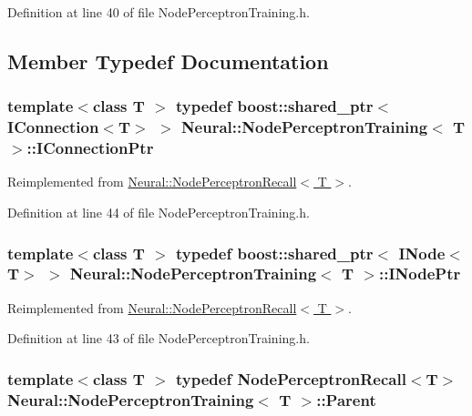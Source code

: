 Definition at line 40 of file NodePerceptronTraining.h.



\subsection{Member Typedef Documentation}
\hypertarget{class_neural_1_1_node_perceptron_training_acf502a8079c8e875773ac940986af738}{
\subsubsection[{IConnectionPtr}]{\setlength{\rightskip}{0pt plus 5cm}template$<$class T $>$ typedef boost::shared\_\-ptr$<$ {\bf IConnection}$<$T$>$ $>$ {\bf Neural::NodePerceptronTraining}$<$ T $>$::{\bf IConnectionPtr}}}
\label{class_neural_1_1_node_perceptron_training_acf502a8079c8e875773ac940986af738}


Reimplemented from \hyperlink{class_neural_1_1_node_perceptron_recall_a3810ccef790454bbb05dcb86a1743d30}{Neural::NodePerceptronRecall$<$ T $>$}.



Definition at line 44 of file NodePerceptronTraining.h.

\hypertarget{class_neural_1_1_node_perceptron_training_a648d54b9404344efb202207fd40cf769}{
\subsubsection[{INodePtr}]{\setlength{\rightskip}{0pt plus 5cm}template$<$class T $>$ typedef boost::shared\_\-ptr$<$ {\bf INode}$<$T$>$ $>$ {\bf Neural::NodePerceptronTraining}$<$ T $>$::{\bf INodePtr}}}
\label{class_neural_1_1_node_perceptron_training_a648d54b9404344efb202207fd40cf769}


Reimplemented from \hyperlink{class_neural_1_1_node_perceptron_recall_a4c6a00d31ba7b35faf51ead0dcc99e43}{Neural::NodePerceptronRecall$<$ T $>$}.



Definition at line 43 of file NodePerceptronTraining.h.

\hypertarget{class_neural_1_1_node_perceptron_training_a0161b405428cffdd067f35a6cff135ed}{
\subsubsection[{Parent}]{\setlength{\rightskip}{0pt plus 5cm}template$<$class T $>$ typedef {\bf NodePerceptronRecall}$<$T$>$ {\bf Neural::NodePerceptronTraining}$<$ T $>$::{\bf Parent}}}
\label{class_neural_1_1_node_perceptron_training_a0161b405428cffdd067f35a6cff135ed}


